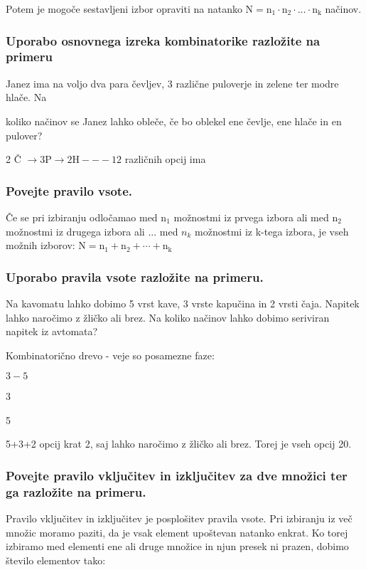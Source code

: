 \documentclass{article}
\begin{document}
Potem je mogoče sestavljeni izbor opraviti na natanko $\mathrm{N}=\mathrm{n}_{1} \cdot \mathrm{n}_{2} \cdot \ldots \cdot \mathrm{n}_{\mathrm{k}}$ načinov.

\subsubsection*{Uporabo osnovnega izreka kombinatorike razložite na primeru}

Janez ima na voljo dva para čevljev, 3 različne puloverje in zelene ter modre hlače. Na

koliko načinov se Janez lahko obleče, če bo oblekel ene čevlje, ene hlače in en pulover?

2 Č $\rightarrow 3 \mathrm{P} \rightarrow 2 \mathrm{H}---12$ različnih opcij ima

\subsubsection*{Povejte pravilo vsote.}

Če se pri izbiranju odločamao med $\mathrm{n}_{1}$ možnostmi iz prvega izbora ali med $\mathrm{n}_{2}$ možnostmi iz drugega izbora ali ... med $n_{k}$ možnostmi iz k-tega izbora, je vseh možnih izborov: $\mathrm{N}=\mathrm{n}_{1}+\mathrm{n}_{2}+\cdots+\mathrm{n}_{\mathrm{k}}$

\subsubsection*{Uporabo pravila vsote razložite na primeru.}

Na kavomatu lahko dobimo 5 vrst kave, 3 vrste kapučina in 2 vrsti čaja. Napitek lahko naročimo z žličko ali brez. Na koliko načinov lahko dobimo seriviran napitek iz avtomata?

Kombinatorično drevo - veje so posamezne faze:

$3-5$

3

5

5+3+2 opcij krat 2, saj lahko naročimo z žličko ali brez. Torej je vseh opcij 20.

\subsubsection*{Povejte pravilo vključitev in izključitev za dve množici ter ga razložite na primeru.}

Pravilo vključitev in izključitev je posplošitev pravila vsote. Pri izbiranju iz več množic moramo paziti, da je vsak element upoštevan natanko enkrat. Ko torej izbiramo med elementi ene ali druge množice in njun presek ni prazen, dobimo število elementov tako:
\end{document}
